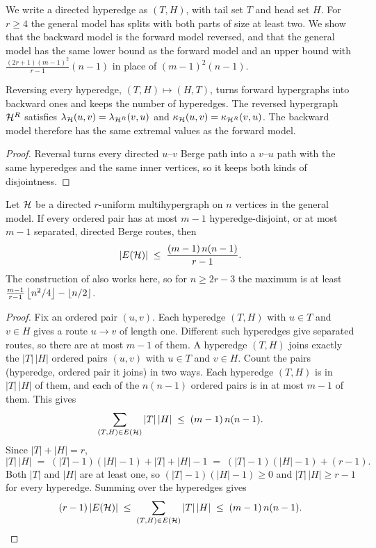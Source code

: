 We write a directed hyperedge as $(T,H)$, with tail set $T$ and head set $H$.
For $r\ge4$ the general model has splits with both parts of size at least two.
We show that the backward model is the forward model reversed, and that the general model has the same lower bound as the forward model and an upper bound with $\frac{(2r+1)(m-1)^2}{r-1}(n-1)$ in place of $(m-1)^2(n-1)$.

\begin{lemma}\label{lem:dir-hyper-duality}
Reversing every hyperedge, $(T, H) \mapsto (H, T)$, turns forward hypergraphs into backward ones and keeps the number of hyperedges. The reversed hypergraph $\mathcal{H}^{R}$ satisfies $\lambda_{\mathcal{H}}(u, v) = \lambda_{\mathcal{H}^{R}}(v, u)$ and $\kappa_{\mathcal{H}}(u, v) = \kappa_{\mathcal{H}^{R}}(v, u)$. The backward model therefore has the same extremal values as the forward model.
\end{lemma}

\begin{proof}
Reversal turns every directed $u$--$v$ Berge path into a $v$--$u$ path with the same hyperedges and the same inner vertices, so it keeps both kinds of disjointness.
\end{proof}

\begin{proposition}\label{prop:dir-hyper-general}
Let $\mathcal{H}$ be a directed $r$-uniform multihypergraph on $n$ vertices in the general model. If every ordered pair has at most $m-1$ hyperedge-disjoint, or at most $m-1$ separated, directed Berge routes, then
\[
    |E(\mathcal{H})| \;\le\; \frac{(m-1)\,n(n-1)}{r-1}.
\]
The construction of  also works here, so for $n\ge2r-3$ the maximum is at least $\frac{m-1}{r-1}\left\lfloor n^2/4 \right\rfloor-\left\lfloor n/2 \right\rfloor$.
\end{proposition}

\begin{proof}
Fix an ordered pair $(u, v)$.
Each hyperedge $(T, H)$ with $u \in T$ and $v \in H$ gives a route $u \to v$ of length one.
Different such hyperedges give separated routes, so there are at most $m-1$ of them.
A hyperedge $(T, H)$ joins exactly the $|T|\,|H|$ ordered pairs $(u,v)$ with $u\in T$ and $v\in H$.
Count the pairs (hyperedge, ordered pair it joins) in two ways.
Each hyperedge $(T,H)$ is in $|T|\,|H|$ of them, and each of the $n(n-1)$ ordered pairs is in at most $m-1$ of them. This gives
\[
    \sum_{(T,H)\in E(\mathcal{H})} |T|\,|H| \;\le\; (m-1)\,n(n-1).
\]
Since $|T|+|H|=r$,
\[
    |T|\,|H| \;=\; (|T|-1)(|H|-1) + |T| + |H| - 1 \;=\; (|T|-1)(|H|-1) + (r-1).
\]
Both $|T|$ and $|H|$ are at least one, so $(|T|-1)(|H|-1)\ge0$ and $|T|\,|H| \ge r-1$ for every hyperedge.
Summing over the hyperedges gives
\[
    (r-1)\,|E(\mathcal{H})| \;\le\; \sum_{(T,H)\in E(\mathcal{H})} |T|\,|H| \;\le\; (m-1)\,n(n-1).
\]
\end{proof}

